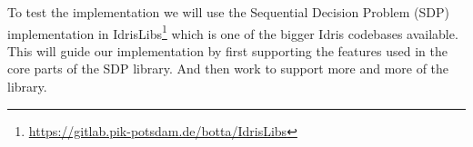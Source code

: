 \documentclass[parskip=half]{scrartcl}
\begin{document}








To test the implementation we will use the Sequential Decision Problem (SDP)
implementation in
IdrisLibs\footnote{\url{https://gitlab.pik-potsdam.de/botta/IdrisLibs}} which
is one of the bigger Idris codebases available. This will guide our
implementation by first supporting the features used in the core parts of the
SDP library. And then work to support more and more of the library.
\end{document}
